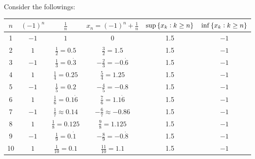 \documentclass[11pt,openany]{article}
\begin{document}
\begin{observation}
Consider the followings:
\begin{table}[h]
\centering{}
\begin{tabular}{c|cc|c||cc}
	\toprule
	\(n\) & \((-1)^n\) & \(\frac{1}{n}\) & \(x_n=(-1)^n + \frac{1}{n}\) & $\sup\set{x_k:k\geq n}$ & $\inf\set{x_k:k\geq n}$ \\
	\midrule
	1  & \(-1\)   & \(1\)       & \(0\) & 1.5 & $-1$ \\
	2  & \(1\)    & \(\tfrac{1}{2}=0.5\)  & \(\tfrac{3}{2}=1.5\) & 1.5 & $-1$   \\
	3  & \(-1\)   & \(\tfrac{1}{3}=0.\dot{3}\)  & \(-\tfrac{2}{3}=-0.\dot{6}\) & 1.5 & $-1$  \\
	4  & \(1\)    & \(\tfrac{1}{4}=0.25\)  & \(\tfrac{5}{4}=1.25\) & 1.5 & $-1$   \\
	5  & \(-1\)   & \(\tfrac{1}{5}=0.2\)  & \(-\tfrac{4}{5}=-0.8\) & 1.5 & $-1$  \\
	6  & \(1\)    & \(\tfrac{1}{6}=0.1\dot{6}\)  & \(\tfrac{7}{6}=1.1\dot{6}\) & 1.5 & $-1$   \\
	7  & \(-1\)   & \(\tfrac{1}{7}\approx 0.14\)  & \(-\tfrac{6}{7}\approx -0.86\) & 1.5 & $-1$  \\
	8  & \(1\)    & \(\tfrac{1}{8}=0.125\)  & \(\tfrac{9}{8}=1.125\) & 1.5 & $-1$   \\
	9  & \(-1\)   & \(\tfrac{1}{9}=0.\dot{1}\)  & \(-\tfrac{8}{9}=-0.\dot{8}\) & 1.5 & $-1$  \\
	10 & \(1\)    & \(\tfrac{1}{10}=0.1\) & \(\tfrac{11}{10}=1.1\) & 1.5 & $-1$ \\
	\bottomrule
\end{tabular}
\end{table}

\begin{center}
\end{center}
\end{observation}
\end{document}
